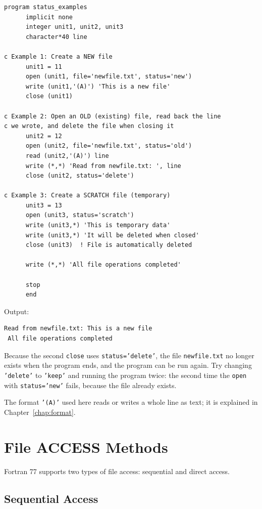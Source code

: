 \begin{lstlisting}[style=fortran77]
      program status_examples
      implicit none
      integer unit1, unit2, unit3
      character*40 line

c Example 1: Create a NEW file
      unit1 = 11
      open (unit1, file='newfile.txt', status='new')
      write (unit1,'(A)') 'This is a new file'
      close (unit1)

c Example 2: Open an OLD (existing) file, read back the line
c we wrote, and delete the file when closing it
      unit2 = 12
      open (unit2, file='newfile.txt', status='old')
      read (unit2,'(A)') line
      write (*,*) 'Read from newfile.txt: ', line
      close (unit2, status='delete')

c Example 3: Create a SCRATCH file (temporary)
      unit3 = 13
      open (unit3, status='scratch')
      write (unit3,*) 'This is temporary data'
      write (unit3,*) 'It will be deleted when closed'
      close (unit3)  ! File is automatically deleted
      
      write (*,*) 'All file operations completed'

      stop
      end
\end{lstlisting}

Output:

\begin{lstlisting}[style=output]
 Read from newfile.txt: This is a new file
 All file operations completed
\end{lstlisting}

Because the second \texttt{close} uses \texttt{status='delete'}, the file \texttt{newfile.txt} no longer exists when the program ends, and the program can be run again. Try changing \texttt{'delete'} to \texttt{'keep'} and running the program twice: the second time the \texttt{open} with \texttt{status='new'} fails, because the file already exists.

The format \texttt{'(A)'} used here reads or writes a whole line as text; it is explained in Chapter~\ref{chap:format}.

\section{File ACCESS Methods}

Fortran 77 supports two types of file access: sequential and direct access.

\subsection{Sequential Access}

